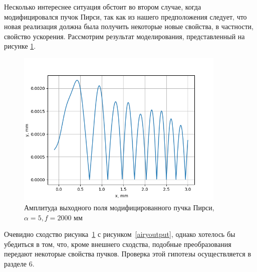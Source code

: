 {    Несколько интереснее ситуация обстоит во втором случае, когда модифицировался пучок Пирси,
    так как из нашего предположения следует, что новая реализация должна была получить некоторые новые свойства,
    в частности, свойство ускорения. Рассмотрим результат моделирования, представленный на рисунке \ref{peodd_output}.
    \begin{figure}[H]
        \begin{center}
            \includegraphics[width=10cm]{plots/peodd_output}
            \caption{Амплитуда выходного поля модифицированного пучка Пирси, $ \alpha  = 5, f = 2000$ мм}
            \label{peodd_output}
        \end{center}
    \end{figure}
    Очевидно сходство рисунка~\ref{peodd_output} с рисунком~\ref{airyoutput}, однако хотелось бы убедиться в том,
    что, кроме внешнего сходства, подобные преобразования передают некоторые свойства пучков.
    Проверка этой гипотезы осуществляется в разделе 6.
    }\label{sec:nohyphens}
    \newpage

